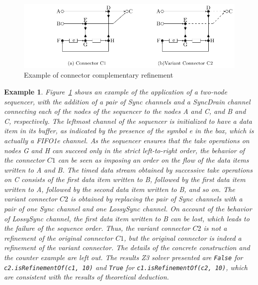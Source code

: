 \documentclass[preprint,3p]{elsarticle}
\newtheorem{example}{Example}[section]
\begin{document}
\begin{figure}[htb]
\centering
\includegraphics[width=.8\textwidth]{sequencer.pdf}
\caption{Example of connector complementary refinement}
\label{fig:large}
\end{figure}
\begin{example}
Figure~\ref{fig:large} shows an example of the application of a two-node sequencer, with the addition of a pair of \emph{Sync} channels and a \emph{SyncDrain} channel connecting each of the nodes of the sequencer to the nodes
\emph{A} and \emph{C}, and \emph{B} and \emph{C}, respectively. The leftmost channel of the sequencer is initialized to have a data item in its buffer, as indicated by the presence of the symbol \emph{e} in the box, which is actually a \emph{FIFO1e} channel. As the sequencer ensures that the take operations on nodes \emph{G} and \emph{H} can succeed only in the strict left-to-right order, the behavior of the connector $C1$ can be seen as imposing an order on the flow of the data items written to \emph{A} and \emph{B}. The timed data stream obtained by successive take operations on \emph{C} consists of the first data item written to \emph{B}, followed by the first data item written to \emph{A}, followed by the second data item written to \emph{B}, and so on. The variant connector $C2$ is obtained by replacing the pair of \emph{Sync} channels with a pair of one \emph{Sync} channel and one \emph{LossySync} channel. On account of the behavior of \emph{LossySync} channel, the first data item written to \emph{B} can be lost, which leads to the failure of the sequence order. Thus, the variant connector $C2$ is not a refinement of the original connector $C1$, but the original connector is indeed a refinement of the variant connector. The details of the concrete construction and the counter example are left out. The results Z3 solver presented are \texttt{False} for \texttt{c2.isRefinementOf(c1, 10)} and \texttt{True} for \texttt{c1.isRefinementOf(c2, 10)}, which are consistent with the results of theoretical deduction.


\end{example}
\end{document}
